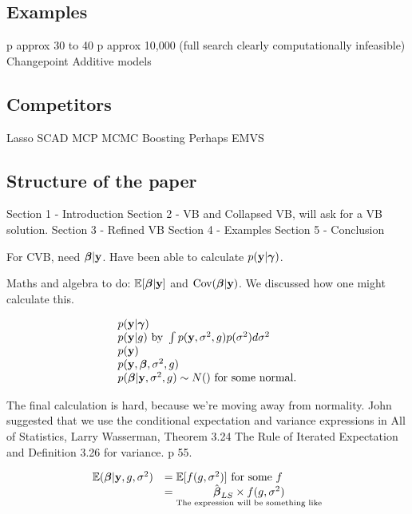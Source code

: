 \documentclass{amsart}
\begin{document}
\subsection{Examples}
p approx 30 to 40
p approx 10,000 (full search clearly computationally infeasible)
Changepoint
Additive models

\subsection{Competitors}
Lasso
SCAD
MCP
MCMC
Boosting
Perhaps EMVS

\subsection{Structure of the paper}
Section 1 - Introduction
Section 2 - VB and Collapsed VB, will ask for a VB solution.
Section 3 - Refined VB
Section 4 - Examples
Section 5 - Conclusion

For CVB, need ${\boldsymbol \beta} | {\bf y}$. Have been able to calculate $p({\bf y} | {\boldsymbol \gamma})$.

Maths and algebra to do: ${\mathbb E}[{\boldsymbol \beta} | {\bf y}]$ and $\text{Cov}({\boldsymbol \beta} | {\bf y})$. We discussed how one might
calculate this.

\begin{equation*}
\begin{array}{l}
p({\bf y} | {\boldsymbol \gamma}) \\
p({\bf y} | g) \text{ by } \int p({\bf y}, \sigma^2, g) p(\sigma^2) d \sigma^2 \\
p({\bf y}) \\
p({\bf y}, {\boldsymbol \beta}, \sigma^2, g) \\
p({\boldsymbol \beta} | {\bf y}, \sigma^2, g) \sim N() \text{ for some normal.} \\
\end{array}
\end{equation*}

The final calculation is hard, because we're moving away from normality. John suggested that we use the
conditional expectation and variance expressions in All of Statistics, Larry Wasserman, Theorem 3.24 The Rule
of Iterated Expectation and Definition 3.26 for variance. p 55.

\begin{equation*}
\begin{array}{ll}
{\mathbb E}({\boldsymbol \beta} | {\bf y}, g, \sigma^2) &= {\mathbb E}[f(g, \sigma^2)] \text{ for some } f \\
&= \underset{\text{The expression will be something like}}{\hat{{\boldsymbol \beta}}_{LS} \times f(g, \sigma^2)}
\end{array}
\end{equation*}
\end{document}
